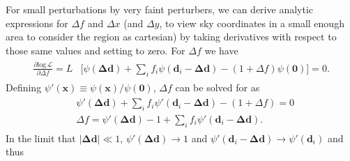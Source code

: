 \documentclass[fleqn,usenatbib]{mnras}
\begin{document}
For small perturbations by very faint perturbers, we can derive analytic expressions for $\Delta f$ and $\Delta x$ (and $\Delta y$, to view sky coordinates in a small enough area to consider the region as cartesian) by taking derivatives with respect to those same values and setting to zero. For $\Delta f$ we have
\begin{align}
\begin{split}
    \frac{\partial\mathrm{log}\,\mathcal{L}}{\partial \Delta f} = L &\bigg[\psi(\mathbf{\Delta d}) + \sum\limits_if_i\psi(\mathbf{d}_i - \mathbf{\Delta d}) - (1 + \Delta f)\psi(\mathbf{0})\bigg] = 0.
\end{split}
\end{align}
Defining $\psi{'}(\mathbf{x}) \equiv \psi(\mathbf{x})/\psi(\mathbf{0})$, $\Delta f$ can be solved for as
\begin{align}
\begin{split}
    &\psi{'}(\mathbf{\Delta d}) + \sum\limits_if_i\psi{'}(\mathbf{d}_i - \mathbf{\Delta d}) - (1 + \Delta f) = 0\\
    &\Delta f = \psi{'}(\mathbf{\Delta d}) - 1 + \sum\limits_if_i\psi{'}(\mathbf{d}_i - \mathbf{\Delta d}).
\label{eq:dfderiv}
\end{split}
\end{align}
In the limit that $\lvert\mathbf{\Delta d}\lvert \ll 1$, $\psi{'}(\mathbf{\Delta d}) \to 1$ and $\psi{'}(\mathbf{d}_i - \mathbf{\Delta d}) \to \psi{'}(\mathbf{d}_i)$ and thus
\end{document}
